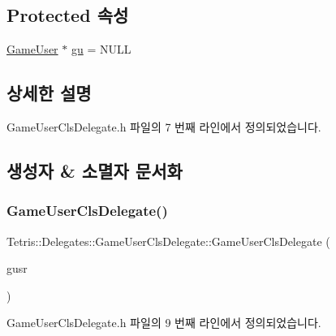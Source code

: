 \subsection*{Protected 속성}
\begin{DoxyCompactItemize}
\item 
\hyperlink{class_tetris_1_1_users_1_1_game_user}{Game\+User} $\ast$ \hyperlink{class_tetris_1_1_delegates_1_1_game_user_cls_delegate_affeaedfa26fa58ee383fff43692f6709}{gu} = N\+U\+LL
\end{DoxyCompactItemize}


\subsection{상세한 설명}


Game\+User\+Cls\+Delegate.\+h 파일의 7 번째 라인에서 정의되었습니다.



\subsection{생성자 \& 소멸자 문서화}
\mbox{\label{class_tetris_1_1_delegates_1_1_game_user_cls_delegate_a0b4ced1872f2e51b74a3960f3a290899}} 
\subsubsection{\texorpdfstring{Game\+User\+Cls\+Delegate()}{GameUserClsDelegate()}\hspace{0.1cm}{\footnotesize\ttfamily [1/2]}}
{\footnotesize\ttfamily Tetris\+::\+Delegates\+::\+Game\+User\+Cls\+Delegate\+::\+Game\+User\+Cls\+Delegate (\begin{DoxyParamCaption}\item[{\hyperlink{class_tetris_1_1_users_1_1_game_user}{Game\+User} $\ast$}]{gusr }\end{DoxyParamCaption})\hspace{0.3cm}{\ttfamily [inline]}}



Game\+User\+Cls\+Delegate.\+h 파일의 9 번째 라인에서 정의되었습니다.

